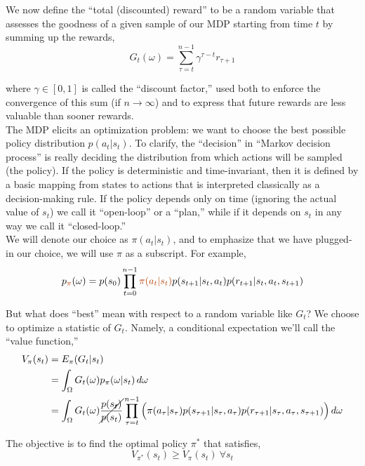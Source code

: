 We now define the ``total (discounted) reward'' to be a random variable that assesses the goodness of a given sample of our MDP starting from time $t$ by summing up the rewards,
\begin{equation*}
G_t(\omega) = \sum_{\tau=t}^{n-1} \gamma^{\tau-t} r_{\tau+1}
\end{equation*}

where $\gamma \in [0,1]$ is called the ``discount factor,'' used both to enforce the convergence of this sum (if $n \to \infty$) and to express that future rewards are less valuable than sooner rewards.\\

The MDP elicits an optimization problem: we want to choose the best possible policy distribution $p(a_t|s_t)$. To clarify, the ``decision'' in ``Markov decision process'' is really deciding the distribution from which actions will be sampled (the policy). If the policy is deterministic and time-invariant, then it is defined by a basic mapping from states to actions that is interpreted classically as a decision-making rule. If the policy depends only on time (ignoring the actual value of $s_t$) we call it ``open-loop'' or a ``plan,'' while if it depends on $s_t$ in any way we call it ``closed-loop.''\\

We will denote our choice as $\pi(a_t|s_t)$, and to emphasize that we have plugged-in our choice, we will use $\pi$ as a subscript. For example,
\begin{equation*}
p_{\orange{\pi}}(\omega) = p(s_0) \prod_{t=0}^{n-1} \orange{\pi(a_t|s_t)}p(s_{t+1}|s_t,a_t)p(r_{t+1}|s_t,a_t,s_{t+1})
\end{equation*}

But what does ``best'' mean with respect to a random variable like $G_t$? We choose to optimize a statistic of $G_t$. Namely, a conditional expectation we'll call the ``value function,''
\begin{align*}
V_\pi(s_t) &= E_\pi(G_t | s_t)\\
&= \int_\Omega G_t(\omega) p_\pi(\omega|s_t)\,d\omega\\
&= \int_\Omega G_t(\omega) \cancel{\frac{p(s_t)}{p(s_t)}}\prod_{\tau=t}^{n-1} \Big{(}\pi(a_\tau|s_\tau)p(s_{\tau+1}|s_\tau,a_\tau)p(r_{\tau+1}|s_\tau,a_\tau,s_{\tau+1})\Big{)} \,d\omega
\end{align*}

The objective is to find the optimal policy $\pi^*$ that satisfies,
\begin{equation*}
V_{\pi^*}(s_t) \geq V_{\pi}(s_t)\ \forall s_t
\end{equation*}

